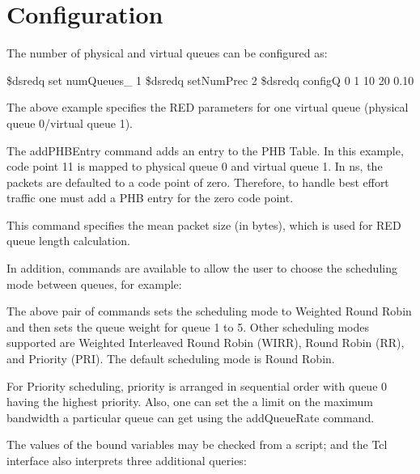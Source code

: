 \section{Configuration}
\label{sec:diffservconfig}

The number of physical and virtual queues can be configured as:

\begin{program}
\$dsredq set numQueues_ 1
\$dsredq setNumPrec 2
\$dsredq configQ 0 1 10 20 0.10
\end{program}

The above example specifies the RED parameters for one virtual queue 
(physical queue 0/virtual queue 1).


The addPHBEntry command adds an entry to the PHB Table.
In this example, code point 11 is mapped to physical queue 0 and 
virtual queue 1. 
In ns, the packets are defaulted to a code point of zero.
Therefore, to handle best effort traffic one must add a PHB entry for the 
zero code point.


This command specifies the mean packet size (in bytes), 
which is used for RED queue length calculation.

In addition, commands are available to allow the user to choose the 
scheduling mode between queues, for example:


The above pair of commands sets the scheduling mode to Weighted Round Robin 
and then sets the queue weight for queue 1 to 5. Other scheduling modes 
supported are Weighted Interleaved Round Robin (WIRR), Round Robin (RR), 
and Priority (PRI). The default scheduling mode is Round Robin.

For Priority scheduling, priority is arranged in sequential order with queue 
0 having the highest priority. Also, one can set the a limit on the maximum 
bandwidth a particular queue can get using the addQueueRate command.



The values of the bound variables may be checked from a script; and the 
 Tcl interface also interprets three additional queries:


